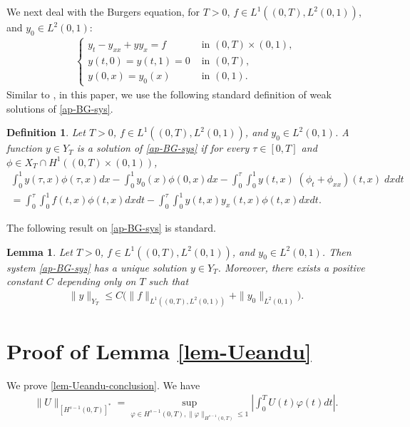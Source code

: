 \documentclass[11pt, reqno]{amsart}
\theoremstyle{plain}
\newtheorem{lemma}[thm]{Lemma}
\newtheorem{definition}{Definition}[section]
\numberwithin{equation}{section}
\begin{document}
 We next deal with the Burgers equation, for $T > 0$, $f \in L^1((0, T), L^2(0, 1))$, and $y_0 \in L^2(0, 1)$: 
\begin{align}		\label{ap-BG-sys}
	\begin{cases}
		y_t - y_{xx} + yy_x = f \quad &\text{ in } (0, T) \times (0, 1), \\[6pt]
		y(t, 0) = y(t, 1) = 0 &\text{ in } (0, T), \\[6pt]
		y(0, x) = y_0(x) &\text{ in } (0, 1).
	\end{cases}
\end{align}
Similar to , in this paper, we use the following standard definition of weak solutions of \eqref{ap-BG-sys}.

\begin{definition} \label{ap-def-sol-BG-0}	Let $T > 0$, $f \in L^1((0, T), L^2(0, 1))$, and $y_0 \in L^2(0, 1)$. A function $y \in Y_T$ is a solution of \eqref{ap-BG-sys} if for every $\tau \in [0, T]$ and $\phi \in X_T \cap H^1((0, T) \times (0, 1))$,
\begin{multline}	\label{ap-def-sol-BG}
	\int_0^1 y(\tau, x) \phi(\tau, x) dx - \int_0^1 y_0(x) \phi(0, x) dx - \int_0^{\tau} \int_0^1 y(t, x) \; (\phi_t + \phi_{xx})(t, x) \; dx dt \\
	 = \int_0^{\tau} \int_0^1 f(t, x) \phi(t, x) dx dt -  \int_0^{\tau} \int_0^1 y(t, x) y_x(t, x) \phi(t, x) dx dt.
\end{multline}
\end{definition}

The following result on \eqref{ap-BG-sys} is standard.  

\begin{lemma}\label{lem-ap1} Let $ T > 0$, $f \in L^1((0, T), L^2(0, 1))$, and  $y_0 \in L^2(0, 1)$. Then system \eqref{ap-BG-sys} has a unique solution $y \in Y_T$. Moreover, there exists a positive constant $C$ depending only on $T$ such that
\begin{align}\label{lem-ap1-cl}
\| y \|_{Y_T} \leq C \Big(  \|  f \|_{L^1((0, T), L^2(0, 1))}  + \| y_0 \|_{L^2(0, 1)} \Big). 
\end{align}
\end{lemma}


\section{Proof of Lemma \ref{lem-Ueandu}} \label{sect-lem-Ueandu}
We prove \eqref{lem-Ueandu-conclusion}. We have
\begin{align}
 \|U\|_{[H^{s - 1}(0, T)]^*} =  \sup_{\varphi \in H^{s - 1}(0, T), \| \varphi \|_{H^{s-1}(0, T)} \le 1} \left| \int_0^T U(t) \varphi(t) dt \right|. 	\label{lem-Ueandu-1}
\end{align}
\end{document}
